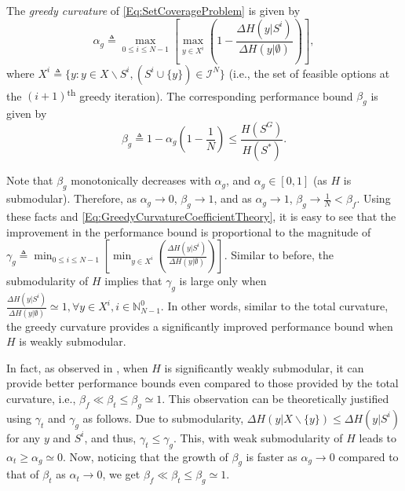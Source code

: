 \documentclass[letterpaper, 10 pt, conference]{ieeeconf}
\newcommand{\N}{\mathbb{N}}
\newcommand{\tsup}[1]{\textsuperscript{#1}}
\begin{document}
The \emph{greedy curvature} of \eqref{Eq:SetCoverageProblem} is given by   
\begin{equation}\label{Eq:GreedyCurvatureCoefficientTheory}
    \alpha_g \triangleq \max_{0 \leq i \leq N-1} \left[ \max_{y \in X^i}\left(1 - \frac{\Delta H(y\vert S^i)}{\Delta H(y\vert \emptyset)}\right) \right],
\end{equation}
where $X^i \triangleq \{y: y \in X \backslash S^i, (S^i \cup \{y\}) \in \mathcal{I}^N\}$ (i.e., the set of feasible options at the $(i+1)$\tsup{th} greedy iteration). The corresponding performance bound $\beta_g$ is given by  
\begin{equation}\label{Eq:GreedyCurvatureBoundTheory}
    \beta_g \triangleq 1-\alpha_g\left(1-\frac{1}{N}\right) \leq \frac{H(S^G)}{H(S^*)}. 
\end{equation}

Note that $\beta_g$ monotonically decreases with $\alpha_g$, and $\alpha_g \in [0,1]$ (as $H$ is submodular). Therefore, as $\alpha_g \rightarrow 0$, $\beta_g \rightarrow 1$, and as $\alpha_g \rightarrow 1$, $\beta_g \rightarrow \frac{1}{N} < \beta_f$. Using these facts and \eqref{Eq:GreedyCurvatureCoefficientTheory}, it is easy to see that the improvement in the performance bound is proportional to the magnitude of 
$ %
\gamma_g \triangleq \min_{0 \leq i \leq N-1} \left[ \min_{y \in X^i}\left(\frac{\Delta H(y\vert S^i)}{\Delta H(y\vert \emptyset)}\right) \right].
$ %
Similar to before, the submodularity of $H$ implies that $\gamma_g$ is large only when 
$\frac{\Delta H(y\vert S^i)}{\Delta H(y\vert \emptyset)} \simeq 1, \forall y\in X^i, i\in \N_{N-1}^0$. 
In other words, similar to the total curvature, the greedy curvature provides a significantly improved performance bound when $H$ is weakly submodular. 

In fact, as observed in \cite{Sun2020}, when $H$ is significantly weakly submodular, it can provide better performance bounds even compared to those provided by the total curvature, i.e., $\beta_f \ll \beta_t \leq \beta_g \simeq 1$. This observation can be theoretically justified using $\gamma_t$ and $\gamma_g$ as follows. Due to submodularity, $\Delta H(y \vert X \backslash \{y\}) \leq \Delta H(y\vert S^i)$ for any $y$ and $S^i$, and thus, $\gamma_t \leq \gamma_g$. This, with weak submodularity of $H$ leads to $\alpha_t \geq \alpha_g \simeq 0$. Now, noticing that the growth of $\beta_g$ is faster as $\alpha_g \rightarrow 0$ compared to that of $\beta_t$ as $\alpha_t \rightarrow 0$, we get $\beta_f \ll \beta_t \leq \beta_g \simeq 1$.
\end{document}
